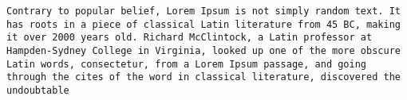 \documentclass[a4paper, 12pt]{article}
\newcommand{\morse}[1]{\noindent\lstinline[breaklines, breakindent=0mm]|#1|}
\begin{document}
	
	\morse{Contrary to popular belief, Lorem Ipsum is not simply random text. It has roots in a piece of classical Latin literature from 45 BC, making it over 2000 years old. Richard McClintock, a Latin professor at Hampden-Sydney College in Virginia, looked up one of the more obscure Latin words, consectetur, from a Lorem Ipsum passage, and going through the cites of the word in classical literature, discovered the undoubtable}
\end{document}
